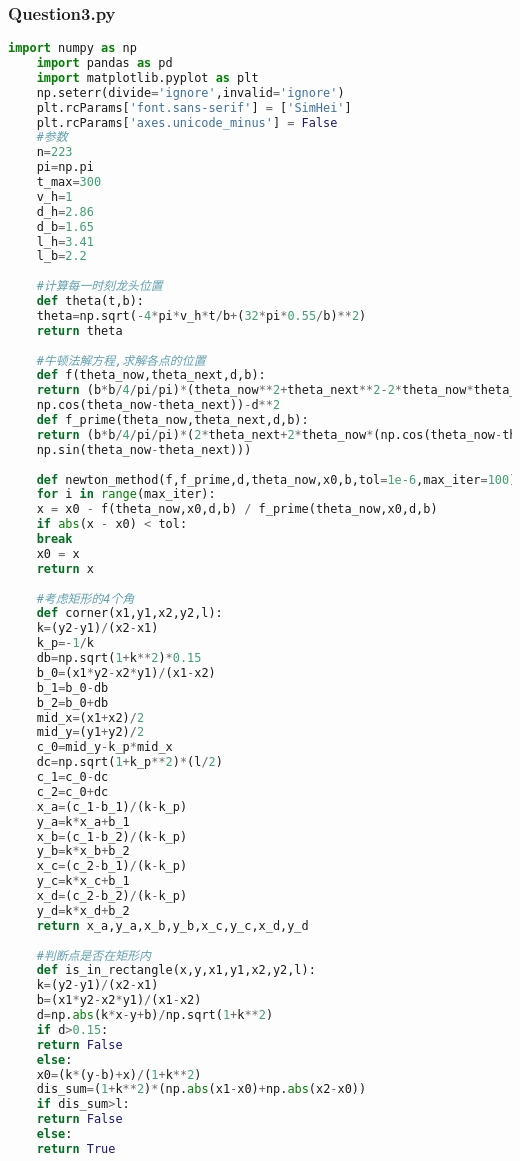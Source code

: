 \documentclass[withoutpreface,bwprint]{cumcmthesis} %
\begin{document}
	\subsubsection*{Question3.py}
	\begin{lstlisting}[language=Python]
	import numpy as np
	import pandas as pd
	import matplotlib.pyplot as plt
	np.seterr(divide='ignore',invalid='ignore')
	plt.rcParams['font.sans-serif'] = ['SimHei']
	plt.rcParams['axes.unicode_minus'] = False
	#参数
	n=223
	pi=np.pi
	t_max=300
	v_h=1
	d_h=2.86
	d_b=1.65
	l_h=3.41
	l_b=2.2
	
	#计算每一时刻龙头位置
	def theta(t,b):
	theta=np.sqrt(-4*pi*v_h*t/b+(32*pi*0.55/b)**2)
	return theta
	
	#牛顿法解方程,求解各点的位置
	def f(theta_now,theta_next,d,b):
	return (b*b/4/pi/pi)*(theta_now**2+theta_next**2-2*theta_now*theta_next*
	np.cos(theta_now-theta_next))-d**2
	def f_prime(theta_now,theta_next,d,b):
	return (b*b/4/pi/pi)*(2*theta_next+2*theta_now*(np.cos(theta_now-theta_next)-theta_next*
	np.sin(theta_now-theta_next)))
	
	def newton_method(f,f_prime,d,theta_now,x0,b,tol=1e-6,max_iter=100):
	for i in range(max_iter):
	x = x0 - f(theta_now,x0,d,b) / f_prime(theta_now,x0,d,b)
	if abs(x - x0) < tol:
	break
	x0 = x
	return x    
	
	#考虑矩形的4个角
	def corner(x1,y1,x2,y2,l):
	k=(y2-y1)/(x2-x1)
	k_p=-1/k
	db=np.sqrt(1+k**2)*0.15
	b_0=(x1*y2-x2*y1)/(x1-x2)
	b_1=b_0-db
	b_2=b_0+db
	mid_x=(x1+x2)/2
	mid_y=(y1+y2)/2
	c_0=mid_y-k_p*mid_x
	dc=np.sqrt(1+k_p**2)*(l/2)
	c_1=c_0-dc
	c_2=c_0+dc
	x_a=(c_1-b_1)/(k-k_p)
	y_a=k*x_a+b_1
	x_b=(c_1-b_2)/(k-k_p)
	y_b=k*x_b+b_2
	x_c=(c_2-b_1)/(k-k_p)
	y_c=k*x_c+b_1
	x_d=(c_2-b_2)/(k-k_p)
	y_d=k*x_d+b_2
	return x_a,y_a,x_b,y_b,x_c,y_c,x_d,y_d
	
	#判断点是否在矩形内
	def is_in_rectangle(x,y,x1,y1,x2,y2,l):
	k=(y2-y1)/(x2-x1)
	b=(x1*y2-x2*y1)/(x1-x2)
	d=np.abs(k*x-y+b)/np.sqrt(1+k**2)
	if d>0.15:
	return False
	else:
	x0=(k*(y-b)+x)/(1+k**2)
	dis_sum=(1+k**2)*(np.abs(x1-x0)+np.abs(x2-x0))
	if dis_sum>l:
	return False
	else:
	return True
	

\end{lstlisting}
\end{document}
